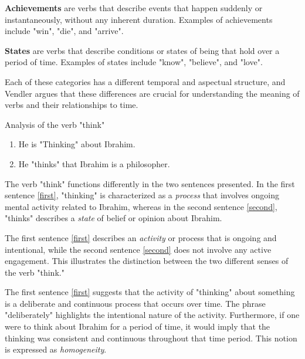 \textbf{Achievements} are verbs that describe events that happen suddenly or instantaneously, without any inherent duration. Examples of achievements include "win", "die", and "arrive".


\textbf{States} are verbs that describe conditions or states of being that hold over a period of time. Examples of states include "know", "believe", and "love".

Each of these categories has a different temporal and aspectual structure, and Vendler argues that these differences are crucial for understanding the meaning of verbs and their relationships to time.



\begin{exmp} Analysis of the verb "think"
\begin{enumerate}
  \item He is "Thinking" about Ibrahim. \label{first}
  \item He "thinks" that Ibrahim is a philosopher. \label{second}
\end{enumerate}

The verb "think" functions differently in the two sentences presented. In the first sentence \ref{first}, "thinking" is characterized as a \textit{process} that involves ongoing mental activity related to Ibrahim, whereas in the second sentence \ref{second}, "thinks" describes a \textit{state} of belief or opinion about Ibrahim.

 The first sentence \ref{first} describes an \textit{activity} or process that is ongoing and intentional, while the second sentence \ref{second} does not involve any active engagement. This illustrates the distinction between the two different senses of the verb "think."

 The first sentence \ref{first} suggests that the activity of "thinking" about something is a deliberate and continuous process that occurs over time. The phrase "deliberately" highlights the intentional nature of the activity. Furthermore, if one were to think about Ibrahim for a period of time, it would imply that the thinking was consistent and continuous throughout that time period. This notion is expressed as \textit{homogeneity}.
\end{exmp}



